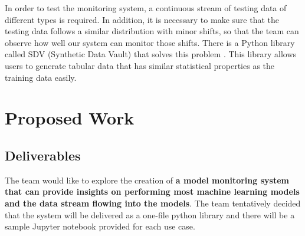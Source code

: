 \documentclass[
	letterpaper, %
	12pt, %
]{CSUniSchoolLabReport}
\begin{document}
In order to test the monitoring system, a continuous stream of testing data of different types is required. In addition, it is necessary to make sure that the testing data follows a similar distribution with minor shifts, so that the team can observe how well our system can monitor those shifts. There is a Python library called SDV (Synthetic Data Vault) that solves this problem \autocite{7796926}. This library allows users to generate tabular data that has similar statistical properties as the training data easily.  





\section{Proposed Work}
\subsection{Deliverables}
The team would like to explore the creation of \textbf{a model monitoring system that can provide insights on performing most machine learning models and the data stream flowing into the models}. The team tentatively decided that the system will be delivered as a one-file python library and there will be a sample Jupyter notebook provided for each use case. 
\end{document}
